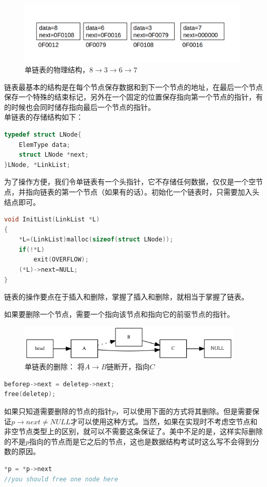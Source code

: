 \documentclass[a4paper]{article}
\begin{document}
\begin{CJK}{UTF8}{gbsn}
\begin{figure}[htbp]
\centering\includegraphics[height=3cm]{linkList4.png}
\caption{单链表的物理结构，$8\rightarrow 3\rightarrow 6\rightarrow 7$}
\end{figure}


链表最基本的结构是在每个节点保存数据和到下一个节点的地址，在最后一个节点保存一个特殊的结束标记，另外在一个固定的位置保存指向第一个节点的指针，有的时候也会同时储存指向最后一个节点的指针。\\
单链表的存储结构如下：

\begin{lstlisting}[language=C++]
typedef struct LNode{
    ElemType data;
    struct LNode *next;
}LNode, *LinkList;
\end{lstlisting}

为了操作方便，我们令单链表有一个头指针，它不存储任何数据，仅仅是一个空节点，并指向链表的第一个节点（如果有的话）。初始化一个链表时，只需要加入头结点即可。

\begin{lstlisting}[language=C++]
void InitList(LinkList *L)
{
    *L=(LinkList)malloc(sizeof(struct LNode));
    if(!*L)
        exit(OVERFLOW);
    (*L)->next=NULL;
}
\end{lstlisting}

链表的操作要点在于插入和删除，掌握了插入和删除，就相当于掌握了链表。

如果要删除一个节点，需要一个指向该节点和指向它的前驱节点的指针。

\begin{figure}[htbp]
\centering\includegraphics[height=1.7cm]{linklist2.png}
\caption{单链表的删除： 将$A\rightarrow B$链断开，指向$C$}
\end{figure}

\begin{lstlisting}[language=C++]
beforep->next = deletep->next;
free(deletep);
\end{lstlisting}


如果只知道需要删除的节点的指针$p$，可以使用下面的方式将其删除。但是需要保证$p\rightarrow next\neq NULL$才可以使用这种方式。当然，如果在实现时不考虑空节点和非空节点类型上的区别，就可以不需要这条保证了。美中不足的是，这样实际删除的不是$p$指向的节点而是它之后的节点，这也是数据结构考试时这么写不会得到分数的原因。
\begin{lstlisting}[language=C++]
*p = *p->next
//you should free one node here
\end{lstlisting}


\end{CJK}
\end{document}
